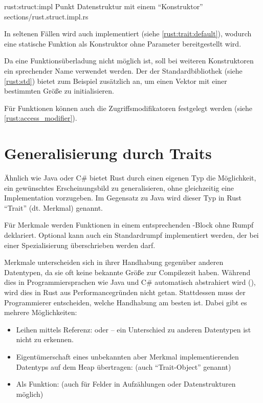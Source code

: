 \rustcinclude
	{rust:struct:impl}
	{Punkt Datenstruktur mit einem \enquote{Konstruktor}}
	{sections/rust.struct.impl.rs}
	
In seltenen Fällen wird auch  implementiert (siehe \autoref{rust:trait:default}), wodurch eine statische Funktion  als Konstruktor ohne Parameter bereitgestellt wird.

Da eine Funktionsüberladung nicht möglich ist, soll bei weiteren Konstruktoren ein sprechender Name verwendet werden.
Der  der Standardbibliothek (siehe \autoref{rust:std}) bietet zum Beispiel zusätzlich  an, um einen Vektor mit einer bestimmten Größe zu initialisieren.

Für Funktionen können auch die Zugriffsmodifikatoren festgelegt werden (siehe \autoref{rust:access_modifier}). 

\section{Generalisierung durch Traits}
\label{rust:trait:default}

Ähnlich wie Java oder C\# bietet Rust durch einen eigenen Typ die Möglichkeit, ein gewünschtes Erscheinungsbild zu generalisieren, ohne gleichzeitig eine Implementation vorzugeben.
Im Gegensatz zu Java wird dieser Typ in Rust \enquote{Trait} (dt. Merkmal) genannt.

Für Merkmale werden Funktionen in einem entsprechenden -Block ohne Rumpf deklariert.
Optional kann auch ein Standardrumpf implementiert werden, der bei einer Spezialisierung überschrieben werden darf.

Merkmale unterscheiden sich in ihrer Handhabung gegenüber anderen Datentypen, da sie oft keine bekannte Größe zur Compilezeit haben.
Während dies in Programmiersprachen wie Java und C\# automatisch abstrahiert wird (), wird dies in Rust aus Performancegründen nicht getan.
Stattdessen muss der Programmierer entscheiden, welche Handhabung am besten ist.
 Dabei gibt es mehrere Möglichkeiten:
\begin{itemize}
	\item Leihen mittels Referenz:  oder  -- ein Unterschied zu anderen Datentypen ist nicht zu erkennen.
	\item Eigentümerschaft eines unbekannten aber Merkmal implementierenden Datentyps auf dem Heap übertragen:  (auch \enquote{Trait-Object} genannt)
	\item Als  Funktion:  (auch für Felder in Aufzählungen oder Datenstrukturen möglich)
\end{itemize}

